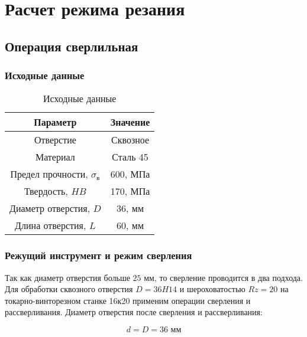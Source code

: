 \section{Расчет режима резания}


\subsection{Операция сверлильная}



\subsubsection{Исходные данные}


    \begin{longtable}{|c|c|}
        \caption{Исходные данные} \\
        \hline Параметр & Значение \\
        \endhead
        \hline Отверстие & Сквозное \\
        \hline Материал & Сталь 45 \\
        \hline Предел прочности, $\sigma_{\text{в}}$ & 600, МПа \\
        \hline Твердость, $HB$ & 170, МПа \\
        \hline Диаметр отверстия, $D$ & 36, мм \\
        \hline Длина отверстия, $L$ & 60, мм \\
        \hline
    \end{longtable}




\subsubsection{Режущий инструмент и режим сверления}

Так как диаметр отверстия больше $25$ мм, то сверление проводится в два подхода. Для обработки сквозного отверстия $D=36H14$ и шероховатостью $Rz=20$ на токарно-винторезном станке 16к20 применим операции сверления и рассверливания. Диаметр отверстия после сверления и рассверливания:

\begin{equation}
	d = D = 36 \text{ мм}
\end{equation}



